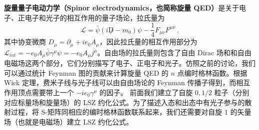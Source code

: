 
\textbf{旋量量子电动力学（Spinor electrodynamics，也简称旋量 QED）}是关于电子、正电子和光子的相互作用的量子场论，拉氏量为
\[
\mathcal{L}=\bar{\psi}(i\not D - m_0)\psi - \frac{1}{4}F_{\mu\nu}F^{\mu\nu}~.
\]
其中协变微商 $D_\mu=\partial_\mu+ie_0 A_\mu$，因此拉氏量的相互作用部分为 $\mathcal{L}_{int}=-e_0 A_\mu \bar\psi \gamma^\mu \psi=-e_0 A_\mu j^{\mu}$。自由场的拉氏量则包含了自由 Dirac 场和和自由电磁场这两个部分，它们分别描写了电子、正电子和光子。仿照之前的讨论，我们可以通过统计 Feynman 图的贡献来计算旋量 QED 的 $n$ 点编时格林函数。根据 Wick 定理，费米子线与光子线可以由自由场论的 Feynman 传播子得到，而相互作用顶点需要带上一个 $-ie_0 \gamma^\mu$ 的因子。
前面我们建立了自旋 $0,1/2$ 粒子（分别对应标量场和旋量场）的 LSZ 约化公式。为了描述入态和出态中有光子参与的散射过程，将 S-矩阵同相应的编时格林函数联系起来，我们还需要对自旋 $1$ 的矢量场（也就是电磁场）建立 LSZ 约化公式。

